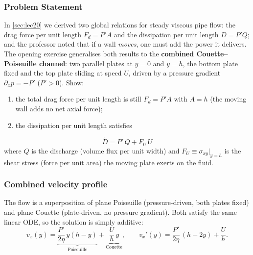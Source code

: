 \documentclass[../main.tex]{subfiles}
\begin{document}
\subsubsection*{Problem Statement}
In \cref{sec:lec20} we derived two global relations for steady viscous pipe flow: the drag force per unit length $F_d=P'A$ and the dissipation per unit length $D=P'Q$; and the professor noted that if a wall \emph{moves}, one must add the power it delivers. The opening exercise generalises both results to the \textbf{combined Couette--Poiseuille channel}: two parallel plates at $y=0$ and $y=h$, the bottom plate fixed and the top plate sliding at speed $U$, driven by a pressure gradient $\partial_x p=-P'$ ($P'>0$). Show:
\begin{enumerate}
  \item the total drag force per unit length is still $F_d=P'A$ with $A=h$ (the moving wall adds no net axial force);
  \item the dissipation per unit length satisfies
\end{enumerate}
\begin{equation}
  \boxed{\;\tilde{D}=P'\,Q+F_U\,U\;}
  \label{eq:lec21_dissipation}
\end{equation}
where $Q$ is the discharge (volume flux per unit width) and $F_U\equiv\sigma_{xy}\big|_{y=h}$ is the shear stress (force per unit area) the moving plate exerts on the fluid.

\subsubsection*{Combined velocity profile}
The flow is a superposition of plane Poiseuille (pressure-driven, both plates fixed) and plane Couette (plate-driven, no pressure gradient). Both satisfy the same linear ODE, so the solution is simply additive:
\begin{equation}
  v_x(y)=\underbrace{\frac{P'}{2\eta}\,y(h-y)}_{\text{Poiseuille}}+\underbrace{\frac{U}{h}\,y}_{\text{Couette}},
  \qquad
  v_x'(y)=\frac{P'}{2\eta}\,(h-2y)+\frac{U}{h}.
  \label{eq:lec21_combined_profile}
\end{equation}
\end{document}
